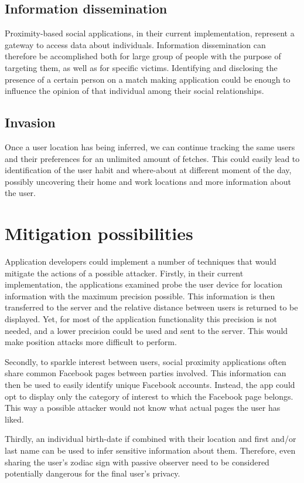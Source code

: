 \subsection{Information dissemination}
\noindent
Proximity-based social applications, in their current implementation, represent a gateway to access data about individuals. Information dissemination can therefore be accomplished both for large group of people with the purpose of targeting them, as well as for specific victims.
Identifying and disclosing the presence of a certain person on a match making application could be enough to influence the opinion of that individual among their social relationships.

\subsection{Invasion}
Once a user location has being inferred, we can continue tracking the same users and their preferences for an unlimited amount of fetches. This could easily lead to identification of the user habit and where-about at different moment of the day, possibly uncovering their home and work locations and more information about the user.

\section{Mitigation possibilities}
\noindent
Application developers could implement a number of techniques that would mitigate the actions of a possible attacker. Firstly, in their current implementation, the applications examined probe the user device for location information with the maximum precision possible. This information is then transferred to the server and the relative distance between users is returned to be displayed. Yet, for most of the application functionality this precision is not needed, and a lower precision could be used and sent to the server. This would make position attacks more difficult to perform.

Secondly, to sparkle interest between users, social proximity applications often share common Facebook pages between parties involved. This information can then be used to easily identify unique Facebook accounts. Instead, the app could opt to display only the category of interest to which the Facebook page belongs. This way a possible attacker would not know what actual pages the user has liked.

Thirdly, an individual birth-date if combined with their location and first and/or last name can be used to infer sensitive information about them. Therefore, even sharing the user's zodiac sign with passive observer need to be considered potentially dangerous for the final user's privacy.


